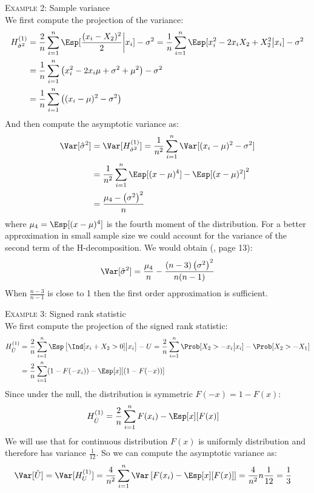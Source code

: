 \documentclass[12pt]{article}
\begin{document}
\clearpage

\textsc{Example 2}: Sample variance \\
We first compute the \Hajek projection of the variance:
\begin{align*}
H^{(1)}_{\hat{\sigma}^2} &= \frac{2}{n} \sum_{i=1}^n  \Esp[\frac{(x_i-X_2)^2}{2} \bigg|x_i]  - \sigma^2 = \frac{1}{n} \sum_{i=1}^n \Esp[x_i^2 - 2 x_i X_2 + X_2^2 \big|x_i]  - \sigma^2 \\
&= \frac{1}{n} \sum_{i=1}^n \left( x_i^2 - 2 x_i \mu + \sigma^2 + \mu^2 \right)  - \sigma^2 \\
&= \frac{1}{n} \sum_{i=1}^n \left( (x_i - \mu)^2 - \sigma^2 \right) 
\end{align*}
And then compute the asymptotic variance as:
\begin{align*}
\Var[\hat{\sigma}^2] &=   \Var[H^{(1)}_{\hat{\sigma}^2}] = \frac{1}{n^2} \sum_{i=1}^n  \Var[ (x_i - \mu)^2 - \sigma^2]\\
&= \frac{1}{n^2} \sum_{i=1}^n \Esp[(x - \mu)^4]-\Esp[(x - \mu)^2]^2 \\
&=\frac{\mu_4-\left(\sigma^2\right)^2}{n}  
\end{align*}
where \(\mu_4=\Esp[(x - \mu)^4]\) is the fourth moment of the
distribution. For a better approximation in small sample size we could
account for the variance of the second term of the H-decomposition. We
would obtain (\cite{lee1990u}, page 13):
\begin{align*}
\Var[\hat{\sigma}^2] = \frac{\mu_4}{n}-\frac{(n-3)\left(\sigma^2\right)^2}{n(n-1)}  
\end{align*}
When \(\frac{n-3}{n-1}\) is close to 1 then the first order
approximation is sufficient.

\bigskip

\textsc{Example 3}: Signed rank statistic \\
We first compute the \Hajek projection of the signed rank statistic:
\begin{align*}
 H^{(1)}_{\hat{U}} &=   \frac{2}{n} \sum_{i=1}^n \Esp\left[ \Ind[x_i+X_2>0] \big|x_i \right] - U = \frac{2}{n} \sum_{i=1}^n \Prob[ X_{2} > -x_i \big|x_i] - \Prob[X_{2}> - X_{1}] \\
 &= \frac{2}{n} \sum_{i=1}^n (1 - F(-x_i)) - \Esp[x][(1 - F(-x))] \\
\end{align*}
Since under the null, the distribution is symmetric \(F(-x)=1-F(x)\):
\begin{align*}
 H^{(1)}_{\hat{U}} &= \frac{2}{n} \sum_{i=1}^n F(x_i) - \Esp[x][F(x)]
\end{align*}
We will use that for continuous distribution \(F(x)\) is uniformly
distribution and therefore has variance \(\frac{1}{12}\). So we can
compute the asymptotic variance as:
\begin{align*}
\Var[\hat{U}] &= \Var[H^{(1)}_{U}] = \frac{4}{n^2} \sum_{i=1}^n \Var\left[ F(x_i) - \Esp[x][F(x)] \right] = \frac{4}{n^2} n \frac{1}{12} = \frac{1}{3}
\end{align*}
\end{document}
